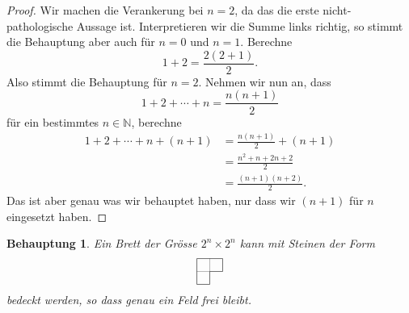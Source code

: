 \documentclass[12pt,a4paper]{article}
\newtheorem*{claim}{Behauptung}
\theoremstyle{definition}
\begin{document}
\begin{proof}
  Wir machen die Verankerung bei $n = 2$, da das
  die erste nicht-pathologische Aussage ist.
  Interpretieren wir die Summe links richtig,
  so stimmt die Behauptung aber auch für $n= 0$ und $n = 1$.
  Berechne
  \[1 + 2 = \frac{2(2+1)}{2}.\]
  Also stimmt die Behauptung für $n = 2$. Nehmen wir nun an, dass
  \[1 + 2 + \cdots + n = \frac{n(n+1)}{2}\]
  für ein bestimmtes $n \in \mathbb N$, berechne
  \begin{align*}
    1 + 2 + \cdots + n + (n+1) &= \frac{n(n+1)}{2} + (n+1) \\
                               &= \frac{n^2 + n + 2n + 2}{2} \\
                               &= \frac{(n+1)(n+2)}{2}.
  \end{align*}
  Das ist aber genau was wir behauptet haben,
  nur dass wir $(n+1)$ für $n$ eingesetzt haben.
\end{proof}

\begin{claim}
  Ein Brett der Grösse $2^{n} \times 2^{n}$
  kann mit Steinen der Form
  \[
    \begin{tikzpicture}[scale=0.4]
      \draw[gray] (0, 1) -- (1, 1) -- (1, 2);
      \draw (0, 0) -- (0, 2) -- (2, 2)
      -- (2, 1) -- (1, 1)
      -- (1, 0) -- cycle;
    \end{tikzpicture}
  \]
  bedeckt werden, so dass genau ein Feld frei bleibt.
\end{claim}
\end{document}
